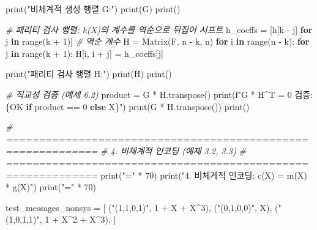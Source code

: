 \documentclass[
  oneside]{article}
\newenvironment{Shaded}{}{}
\newcommand{\BuiltInTok}[1]{\textcolor[rgb]{0.00,0.50,0.00}{#1}}
\newcommand{\CommentTok}[1]{\textcolor[rgb]{0.38,0.63,0.69}{\textit{#1}}}
\newcommand{\ControlFlowTok}[1]{\textcolor[rgb]{0.00,0.44,0.13}{\textbf{#1}}}
\newcommand{\DecValTok}[1]{\textcolor[rgb]{0.25,0.63,0.44}{#1}}
\newcommand{\KeywordTok}[1]{\textcolor[rgb]{0.00,0.44,0.13}{\textbf{#1}}}
\newcommand{\NormalTok}[1]{#1}
\newcommand{\OperatorTok}[1]{\textcolor[rgb]{0.40,0.40,0.40}{#1}}
\newcommand{\SpecialCharTok}[1]{\textcolor[rgb]{0.25,0.44,0.63}{#1}}
\newcommand{\SpecialStringTok}[1]{\textcolor[rgb]{0.73,0.40,0.53}{#1}}
\newcommand{\StringTok}[1]{\textcolor[rgb]{0.25,0.44,0.63}{#1}}
\begin{document}
\begin{Shaded}
\begin{Highlighting}[]
\BuiltInTok{print}\NormalTok{(}\StringTok{"비체계적 생성 행렬 G:"}\NormalTok{)}
\BuiltInTok{print}\NormalTok{(G)}
\BuiltInTok{print}\NormalTok{()}

\CommentTok{\# 패리티 검사 행렬: h(X)의 계수를 역순으로 뒤집어 시프트}
\NormalTok{h\_coeffs }\OperatorTok{=}\NormalTok{ [h[k }\OperatorTok{{-}}\NormalTok{ j] }\ControlFlowTok{for}\NormalTok{ j }\KeywordTok{in} \BuiltInTok{range}\NormalTok{(k }\OperatorTok{+} \DecValTok{1}\NormalTok{)]  }\CommentTok{\# 역순 계수}
\NormalTok{H }\OperatorTok{=}\NormalTok{ Matrix(F, n }\OperatorTok{{-}}\NormalTok{ k, n)}
\ControlFlowTok{for}\NormalTok{ i }\KeywordTok{in} \BuiltInTok{range}\NormalTok{(n }\OperatorTok{{-}}\NormalTok{ k):}
    \ControlFlowTok{for}\NormalTok{ j }\KeywordTok{in} \BuiltInTok{range}\NormalTok{(k }\OperatorTok{+} \DecValTok{1}\NormalTok{):}
\NormalTok{        H[i, i }\OperatorTok{+}\NormalTok{ j] }\OperatorTok{=}\NormalTok{ h\_coeffs[j]}

\BuiltInTok{print}\NormalTok{(}\StringTok{"패리티 검사 행렬 H:"}\NormalTok{)}
\BuiltInTok{print}\NormalTok{(H)}
\BuiltInTok{print}\NormalTok{()}

\CommentTok{\# 직교성 검증 (예제 6.2)}
\NormalTok{product }\OperatorTok{=}\NormalTok{ G }\OperatorTok{*}\NormalTok{ H.transpose()}
\BuiltInTok{print}\NormalTok{(}\SpecialStringTok{f"G * H\^{}T = 0 검증: }\SpecialCharTok{\{}\StringTok{\textquotesingle{}OK\textquotesingle{}} \ControlFlowTok{if}\NormalTok{ product }\OperatorTok{==} \DecValTok{0} \ControlFlowTok{else} \StringTok{\textquotesingle{}X\textquotesingle{}}\SpecialCharTok{\}}\SpecialStringTok{"}\NormalTok{)}
\BuiltInTok{print}\NormalTok{(G }\OperatorTok{*}\NormalTok{ H.transpose())}
\BuiltInTok{print}\NormalTok{()}

\CommentTok{\# ============================================================}
\CommentTok{\# 4. 비체계적 인코딩 (예제 3.2, 3.3)}
\CommentTok{\# ============================================================}
\BuiltInTok{print}\NormalTok{(}\StringTok{"="} \OperatorTok{*} \DecValTok{70}\NormalTok{)}
\BuiltInTok{print}\NormalTok{(}\StringTok{"4. 비체계적 인코딩: c(X) = m(X) * g(X)"}\NormalTok{)}
\BuiltInTok{print}\NormalTok{(}\StringTok{"="} \OperatorTok{*} \DecValTok{70}\NormalTok{)}

\NormalTok{test\_messages\_nonsys }\OperatorTok{=}\NormalTok{ [}
\NormalTok{    (}\StringTok{"(1,1,0,1)"}\NormalTok{, }\DecValTok{1} \OperatorTok{+}\NormalTok{ X }\OperatorTok{+}\NormalTok{ X}\OperatorTok{\^{}}\DecValTok{3}\NormalTok{),}
\NormalTok{    (}\StringTok{"(0,1,0,0)"}\NormalTok{, X),}
\NormalTok{    (}\StringTok{"(1,0,1,1)"}\NormalTok{, }\DecValTok{1} \OperatorTok{+}\NormalTok{ X}\OperatorTok{\^{}}\DecValTok{2} \OperatorTok{+}\NormalTok{ X}\OperatorTok{\^{}}\DecValTok{3}\NormalTok{),}
\NormalTok{]}


\end{Highlighting}
\end{Shaded}
\end{document}

